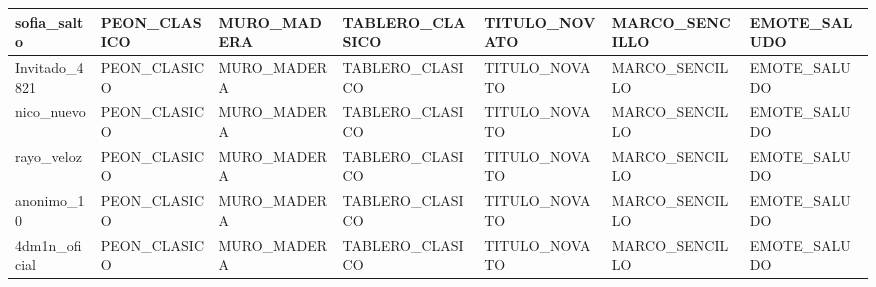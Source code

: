 \begin{center}
\begin{longtable}{|L{44.8pt}|L{54.8pt}|L{62.2pt}|L{68.4pt}|L{91.1pt}|L{63.6pt}|L{55.3pt}|}
sofia\_\allowbreak{}salto & PEON\_\allowbreak{}CLASICO & MURO\_\allowbreak{}MADERA & TABLERO\_\allowbreak{}CLASICO & TITULO\_\allowbreak{}NOVATO & MARCO\_\allowbreak{}SENCILLO & EMOTE\_\allowbreak{}SALUDO \\ \hline
Invitado\_\allowbreak{}4821 & PEON\_\allowbreak{}CLASICO & MURO\_\allowbreak{}MADERA & TABLERO\_\allowbreak{}CLASICO & TITULO\_\allowbreak{}NOVATO & MARCO\_\allowbreak{}SENCILLO & EMOTE\_\allowbreak{}SALUDO \\ \hline
nico\_\allowbreak{}nuevo & PEON\_\allowbreak{}CLASICO & MURO\_\allowbreak{}MADERA & TABLERO\_\allowbreak{}CLASICO & TITULO\_\allowbreak{}NOVATO & MARCO\_\allowbreak{}SENCILLO & EMOTE\_\allowbreak{}SALUDO \\ \hline
rayo\_\allowbreak{}veloz & PEON\_\allowbreak{}CLASICO & MURO\_\allowbreak{}MADERA & TABLERO\_\allowbreak{}CLASICO & TITULO\_\allowbreak{}NOVATO & MARCO\_\allowbreak{}SENCILLO & EMOTE\_\allowbreak{}SALUDO \\ \hline
anonimo\_\allowbreak{}10 & PEON\_\allowbreak{}CLASICO & MURO\_\allowbreak{}MADERA & TABLERO\_\allowbreak{}CLASICO & TITULO\_\allowbreak{}NOVATO & MARCO\_\allowbreak{}SENCILLO & EMOTE\_\allowbreak{}SALUDO \\ \hline
4dm1n\_\allowbreak{}oficial & PEON\_\allowbreak{}CLASICO & MURO\_\allowbreak{}MADERA & TABLERO\_\allowbreak{}CLASICO & TITULO\_\allowbreak{}NOVATO & MARCO\_\allowbreak{}SENCILLO & EMOTE\_\allowbreak{}SALUDO \\ \hline
\end{longtable}
\end{center}
